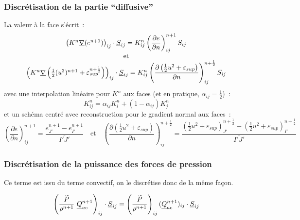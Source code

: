 \subsubsection*{Discr\'etisation de la partie ``diffusive''}

La valeur \`a la face s'\'ecrit~:
\begin{equation}
\begin{array}{c}
\left(K^n\underline{\nabla}(e^{n+1})\right)_{ij}\cdot\underline{S}_{ij}
= K_{ij}^n
\displaystyle \left( \frac{\partial e}{\partial n} \right)^{n+1}_{ij}S_{ij}\\
\text{et}\\
\left(K^n \underline{\nabla}\left(\frac{1}{2}(u^2)^{n+1}
+ \varepsilon_{sup}^{n+\frac{1}{2}}\right)\right)_{ij}\cdot\underline{S}_{ij}
= K_{ij}^n
\displaystyle \left( \frac{\partial \left(\frac{1}{2} u^2
+ \varepsilon_{sup}\right)}{\partial n} \right)^{n+\frac{1}{2}}_{ij}S_{ij}
\end{array}
\end{equation}
avec une interpolation lin\'eaire pour
$K^n$ aux faces (et en pratique, $\alpha_{ij}=\frac{1}{2}$)~:
\begin{equation}
K_{ij}^n
= \alpha_{ij}K_{i}^n+(1-\alpha_{ij})K_{j}^n
\end{equation}
et un sch\'ema centr\'e avec reconstruction pour le gradient normal aux faces~:
\begin{equation}
\displaystyle \left( \frac{\partial e}{\partial n} \right)^{n+1}_{ij}
= \displaystyle\frac{e_{J'}^{n+1} - e_{I'}^{n+1}}{\overline{I'J'}}
\quad \text{et} \quad
\displaystyle \left( \frac{\partial \left(\frac{1}{2} u^2
+ \varepsilon_{sup}\right)}{\partial n} \right)^{n+\frac{1}{2}}_{ij}
= \displaystyle\frac{(\frac{1}{2} u^2
+ \varepsilon_{sup})_{J'}^{n+\frac{1}{2}} - (\frac{1}{2} u^2
+ \varepsilon_{sup})_{I'}^{n+\frac{1}{2}}}{\overline{I'J'}}
\end{equation}



\subsubsection*{Discr\'etisation de la puissance des forces de pression}

Ce terme
est issu du terme convectif, on le discr\'etise donc de la m\^eme fa\c con.

\begin{equation}
\left(\displaystyle\frac{\widetilde{P}}{\rho^{n+1}}\
\underline{Q}_{ac}^{n+1}\right)_{ij} \cdot \underline{S}_{ij}
= \left(\displaystyle\frac{\widetilde{P}}{\rho^{n+1}}\right)_{ij}
(\underline{Q}_{ac}^{n+1})_{ij} \cdot \underline{S}_{ij}
\end{equation}

